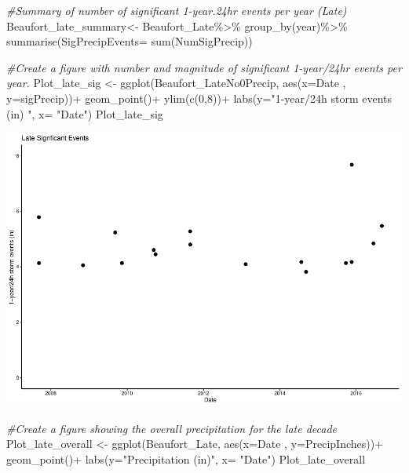 \documentclass[
  12pt,
]{article}
\newenvironment{Shaded}{\begin{snugshade}}{\end{snugshade}}
\newcommand{\AttributeTok}[1]{\textcolor[rgb]{0.77,0.63,0.00}{#1}}
\newcommand{\CommentTok}[1]{\textcolor[rgb]{0.56,0.35,0.01}{\textit{#1}}}
\newcommand{\DecValTok}[1]{\textcolor[rgb]{0.00,0.00,0.81}{#1}}
\newcommand{\FunctionTok}[1]{\textcolor[rgb]{0.00,0.00,0.00}{#1}}
\newcommand{\NormalTok}[1]{#1}
\newcommand{\OtherTok}[1]{\textcolor[rgb]{0.56,0.35,0.01}{#1}}
\newcommand{\SpecialCharTok}[1]{\textcolor[rgb]{0.00,0.00,0.00}{#1}}
\newcommand{\StringTok}[1]{\textcolor[rgb]{0.31,0.60,0.02}{#1}}
\begin{document}
\begin{Shaded}
\begin{Highlighting}[]
\CommentTok{\#Summary of number of significant 1{-}year.24hr events per year (Late)}
\NormalTok{Beaufort\_late\_summary}\OtherTok{\textless{}{-}}\NormalTok{ Beaufort\_Late}\SpecialCharTok{\%\textgreater{}\%}
  \FunctionTok{group\_by}\NormalTok{(year)}\SpecialCharTok{\%\textgreater{}\%}
  \FunctionTok{summarise}\NormalTok{(}\AttributeTok{SigPrecipEvents=} \FunctionTok{sum}\NormalTok{(NumSigPrecip))}

\CommentTok{\#Create a figure with number and magnitude of significant 1{-}year/24hr events per year.}
\NormalTok{Plot\_late\_sig }\OtherTok{\textless{}{-}} \FunctionTok{ggplot}\NormalTok{(Beaufort\_LateNo0Precip, }\FunctionTok{aes}\NormalTok{(}\AttributeTok{x=}\NormalTok{Date , }\AttributeTok{y=}\NormalTok{sigPrecip))}\SpecialCharTok{+}
  \FunctionTok{geom\_point}\NormalTok{()}\SpecialCharTok{+}
  \FunctionTok{ylim}\NormalTok{(}\FunctionTok{c}\NormalTok{(}\DecValTok{0}\NormalTok{,}\DecValTok{8}\NormalTok{))}\SpecialCharTok{+}
  \FunctionTok{labs}\NormalTok{(}\AttributeTok{y=}\StringTok{"1{-}year/24h storm events (in) "}\NormalTok{, }\AttributeTok{x=} \StringTok{"Date"}\NormalTok{)}
\NormalTok{Plot\_late\_sig}
\end{Highlighting}
\end{Shaded}

\includegraphics{Project_Template_TLK_files/figure-latex/late-1.pdf}

\begin{Shaded}
\begin{Highlighting}[]
\CommentTok{\#Create a figure showing the overall precipitation for the late decade}
\NormalTok{Plot\_late\_overall }\OtherTok{\textless{}{-}} \FunctionTok{ggplot}\NormalTok{(Beaufort\_Late, }\FunctionTok{aes}\NormalTok{(}\AttributeTok{x=}\NormalTok{Date , }\AttributeTok{y=}\NormalTok{PrecipInches))}\SpecialCharTok{+}
  \FunctionTok{geom\_point}\NormalTok{()}\SpecialCharTok{+}
  \FunctionTok{labs}\NormalTok{(}\AttributeTok{y=}\StringTok{"Precipitation (in)"}\NormalTok{, }\AttributeTok{x=} \StringTok{"Date"}\NormalTok{)}
\NormalTok{Plot\_late\_overall}
\end{Highlighting}
\end{Shaded}
\end{document}
